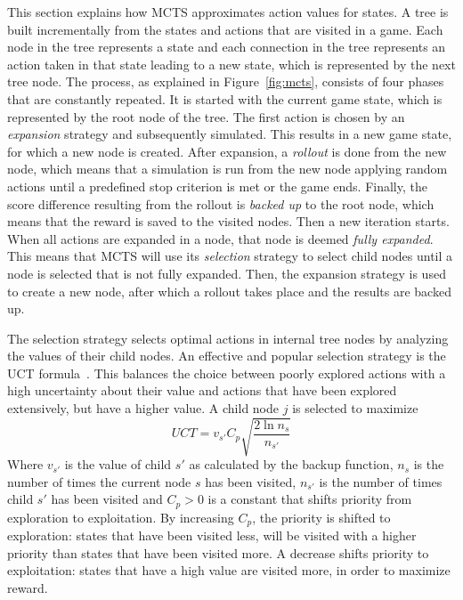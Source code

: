 This section explains how MCTS approximates action values for states.  A tree is
built incrementally from the states and actions that are visited in a game. Each
node in the tree represents a state and each connection in the tree represents
an action taken in that state leading to a new state, which is represented by
the next tree node.  The process, as explained in Figure~\ref{fig:mcts},
consists of four phases that are constantly repeated. It is started with the
current game state, which is represented by the root node of the tree. The first
action is chosen by an \emph{expansion} strategy and subsequently simulated.
This results in a new game state, for which a new node is created. After
expansion, a \emph{rollout} is done from the new node, which means that a
simulation is run from the new node applying random actions until a predefined
stop criterion is met or the game ends. Finally, the score difference resulting
from the rollout is \emph{backed up} to the root node, which means that the
reward is saved to the visited nodes.  Then a new iteration starts. When all
actions are expanded in a node, that node is deemed \emph{fully expanded}.
This means that MCTS will use its \emph{selection} strategy to select child
nodes until a node is selected that is not fully expanded.  Then, the expansion
strategy is used to create a new node, after which a rollout takes place and the
results are backed up.

The selection strategy selects optimal actions in internal tree nodes by
analyzing the values of their child nodes. An effective and popular selection
strategy is the UCT formula~\cite{kocsis2006bandit}. This balances the choice
between poorly explored actions with a high uncertainty about their value and
actions that have been explored extensively, but have a higher value. A child
node $j$ is selected to maximize
\begin{equation}
	\label{eq:uct}
	UCT = v_{s'} C_p \sqrt{\frac{2 \ln n_s}{n_{s'}}}
\end{equation}
Where $v_{s'}$ is the value of child $s'$ as calculated by the backup function,
$n_s$ is the number of times the current node $s$ has been visited, $n_{s'}$ is
the number of times child $s'$ has been visited and $C_p > 0$ is a constant
that shifts priority from exploration to exploitation. By increasing $C_p$, the
priority is shifted to exploration: states that have been visited less, will be
visited with a higher priority than states that have been visited more. A
decrease shifts priority to exploitation: states that have a high value are
visited more, in order to maximize reward. 

